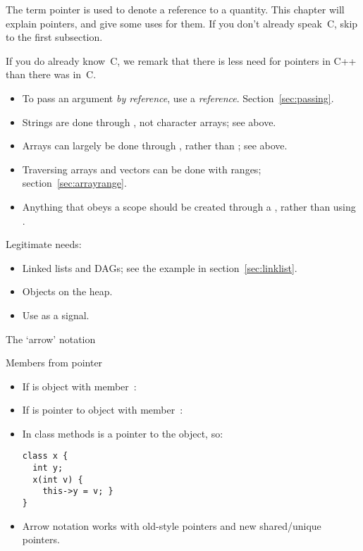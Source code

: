 
The term pointer is used to denote a reference to a quantity.  This
chapter will explain pointers, and give some uses for them.  If you
don't already speak~C, skip to the first subsection.

If you do
already know~C, we remark that there is less need for pointers in C++
than there was in~C.

\begin{itemize}
\item To pass an argument
  \emph{by reference},
  use a \emph{reference}.
  Section~\ref{sec:passing}.
\item Strings are done through , not character arrays;
  see above.
\item Arrays can largely be done through , rather than
  ; see above.
\item Traversing arrays and vectors can be done with ranges;
  section~\ref{sec:arrayrange}.
\item Anything that obeys a scope should be created through a
  , rather than using .
\end{itemize}

Legitimate needs:
\begin{itemize}
\item Linked lists and \acp{DAG}; see the example in section~\ref{sec:linklist}.
\item Objects on the heap.
\item Use  as a signal.
\end{itemize}

 {The `arrow' notation}

\begin{block}{Members from pointer}
  \begin{itemize}
  \item If  is object with member~:\\ 
  \item If  is pointer to object with member~:\\ 
  \item In class methods  is a pointer to the object, so:
\begin{verbatim}
class x {
  int y;
  x(int v) {
    this->y = v; }
}
\end{verbatim}
\item Arrow notation works with old-style pointers and new
  shared/unique pointers.
  \end{itemize}
\end{block}

